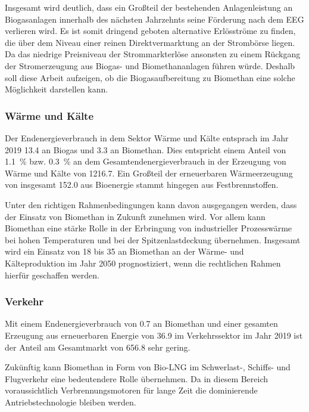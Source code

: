 Insgesamt wird deutlich, dass ein Großteil der bestehenden Anlagenleistung an Biogasanlagen innerhalb des nächsten Jahrzehnts seine Förderung nach dem \gls{EEG} verlieren wird. Es ist somit dringend geboten alternative Erlösströme zu finden, die über dem Niveau einer reinen Direktvermarktung an der Strombörse liegen. Da das niedrige Preisniveau der Strommarkterlöse ansonsten zu einem Rückgang der Stromerzeugung aus Biogas- und Biomethananlagen führen würde. Deshalb soll diese Arbeit aufzeigen, ob die Biogasaufbereitung zu Biomethan eine solche Möglichkeit darstellen kann.



\subsubsection{Wärme und Kälte}

Der Endenergieverbrauch in dem Sektor Wärme und Kälte entsprach im Jahr 2019 \SI{13.4}{\twh} an Biogas und \SI{3.3}{\twh} an Biomethan. Dies entspricht einem Anteil von \SI{1.1}{\percent} bzw. \SI{0.3}{\percent} an dem Gesamtendenergieverbrauch in der Erzeugung von Wärme und Kälte von \SI{1216.7}{\twh}. Ein Großteil der erneuerbaren Wärmeerzeugung von insgesamt \SI{152.0}{\twh} aus Bioenergie stammt hingegen aus Festbrennstoffen. \parencite{BWE2020}\smallskip

Unter den richtigen Rahmenbedingungen kann davon ausgegangen werden, dass der Einsatz von Biomethan in Zukunft zunehmen wird. Vor allem kann Biomethan eine stärke Rolle in der Erbringung von industrieller Prozesswärme bei hohen Temperaturen und bei der Spitzenlastdeckung übernehmen. Insgesamt wird ein Einsatz von \SI{18}{\twh} bis \SI{35}{\twh} an Biomethan an der Wärme- und Kälteproduktion im Jahr 2050 prognostiziert, wenn die rechtlichen Rahmen hierfür geschaffen werden. \parencite{dena2017}


\subsubsection{Verkehr}

Mit einem Endenergieverbrauch von \SI{0.7}{\twh} an Biomethan und einer gesamten Erzeugung aus erneuerbaren Energie von \SI{36.9}{\twh} im Verkehrssektor im Jahr 2019 ist der Anteil am Gesamtmarkt von \SI{656.8}{\twh} sehr gering. \parencite{BWE2020} \smallskip

Zukünftig kann Biomethan in Form von Bio-\gls{LNG} im Schwerlast-, Schiffs- und Flugverkehr eine bedeutendere Rolle übernehmen. Da in diesem Bereich voraussichtlich Verbrennungsmotoren für lange Zeit die dominierende Antriebstechnologie bleiben werden. \parencite{dena2017}